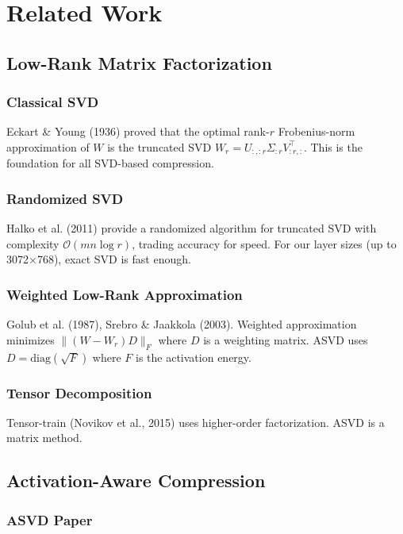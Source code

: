 
\section{Related Work}

\subsection{Low-Rank Matrix Factorization}

\subsubsection{Classical SVD}

Eckart \& Young (1936) proved that the optimal rank-$r$ Frobenius-norm 
approximation of $W$ is the truncated SVD $W_r = U_{:, :r} \Sigma_{:r} V_{:r, :}^\top$. 
This is the foundation for all SVD-based compression.

\subsubsection{Randomized SVD}

Halko et al. (2011) provide a randomized algorithm for truncated SVD with 
complexity $\mathcal{O}(mn \log r)$, trading accuracy for speed. For our 
layer sizes (up to 3072$\times$768), exact SVD is fast enough.

\subsubsection{Weighted Low-Rank Approximation}

Golub et al. (1987), Srebro \& Jaakkola (2003). Weighted approximation 
minimizes $\|(W - W_r) D\|_F$ where $D$ is a weighting matrix. ASVD uses 
$D = \text{diag}(\sqrt{F})$ where $F$ is the activation energy.

\subsubsection{Tensor Decomposition}

Tensor-train (Novikov et al., 2015) uses higher-order factorization. 
ASVD is a matrix method.

\subsection{Activation-Aware Compression}

\subsubsection{ASVD Paper}

